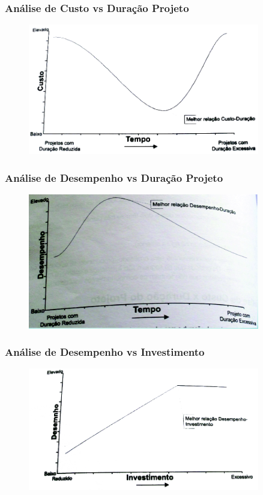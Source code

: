 \begin{frame}
 \frametitle{Análise de Custo vs Duração Projeto}
   \begin{figure}
 \includegraphics[width = 0.9\textwidth]{figs/fig15.png}
\end{figure}
\end{frame}

\begin{frame}
 \frametitle{Análise de Desempenho vs Duração Projeto}
   \begin{figure}
 \includegraphics[width = 0.9\textwidth]{figs/fig16.png}
\end{figure}
\end{frame}

\begin{frame}
 \frametitle{Análise de Desempenho vs Investimento}
   \begin{figure}
 \includegraphics[width = 0.9\textwidth]{figs/fig17.png}
\end{figure}
\end{frame}

